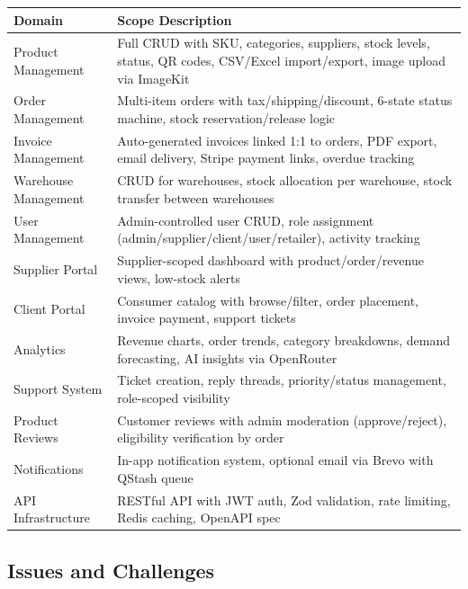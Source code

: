 \documentclass[12pt,onecolumn]{IEEEtran}
\begin{document}
\begin{center}
\begin{tabularx}{\textwidth}{lX}
  \toprule
  \textbf{Domain} & \textbf{Scope Description} \\
  \midrule
  Product Management    & Full CRUD with SKU, categories, suppliers, stock levels, status, QR codes, CSV/Excel import/export, image upload via ImageKit \\
  Order Management      & Multi-item orders with tax/shipping/discount, 6-state status machine, stock reservation/release logic \\
  Invoice Management    & Auto-generated invoices linked 1:1 to orders, PDF export, email delivery, Stripe payment links, overdue tracking \\
  Warehouse Management  & CRUD for warehouses, stock allocation per warehouse, stock transfer between warehouses \\
  User Management       & Admin-controlled user CRUD, role assignment (admin/supplier/client/user/retailer), activity tracking \\
  Supplier Portal       & Supplier-scoped dashboard with product/order/revenue views, low-stock alerts \\
  Client Portal         & Consumer catalog with browse/filter, order placement, invoice payment, support tickets \\
  Analytics             & Revenue charts, order trends, category breakdowns, demand forecasting, AI insights via OpenRouter \\
  Support System        & Ticket creation, reply threads, priority/status management, role-scoped visibility \\
  Product Reviews       & Customer reviews with admin moderation (approve/reject), eligibility verification by order \\
  Notifications         & In-app notification system, optional email via Brevo with QStash queue \\
  API Infrastructure    & RESTful API with JWT auth, Zod validation, rate limiting, Redis caching, OpenAPI spec \\
  \bottomrule
\end{tabularx}
\end{center}

\subsection{Issues and Challenges}
\end{document}
